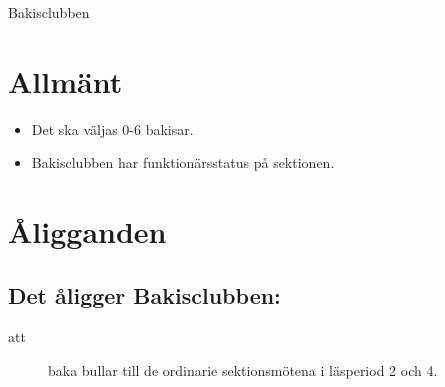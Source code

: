 \documentclass[a4paper]{article}
\begin{document}
\renewcommand{\forening}{Bakisclubben} %
\begin{foreningenv}{\forening{}} %
    \section{Allmänt}
    \begin{itemize}
        \item Det ska väljas 0-6 bakisar.
        \item Bakisclubben har funktionärsstatus på sektionen.
    \end{itemize}
    
    
    \section{Åligganden}
    \aliggsektfunkt{} %
        
    \subsection{Det åligger \forening{}:}
    \begin{description}
          \item[att] baka bullar till de ordinarie sektionsmötena i läsperiod 2 och 4. 
    \end{description}
\end{foreningenv}
\end{document}
